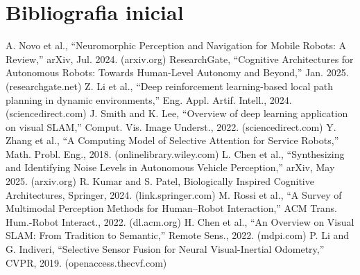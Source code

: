 \documentclass[a4paper,12pt]{article}
\begin{document}
	\section{Bibliografia inicial}
	\begin{thebibliography}{99}
		 A. Novo et al., “Neuromorphic Perception and Navigation for Mobile Robots: A Review,” arXiv, Jul. 2024. (arxiv.org)
		 ResearchGate, “Cognitive Architectures for Autonomous Robots: Towards Human-Level Autonomy and Beyond,” Jan. 2025. (researchgate.net)
		 Z. Li et al., “Deep reinforcement learning-based local path planning in dynamic environments,” Eng. Appl. Artif. Intell., 2024. (sciencedirect.com)
		 J. Smith and K. Lee, “Overview of deep learning application on visual SLAM,” Comput. Vis. Image Underst., 2022. (sciencedirect.com)
		 Y. Zhang et al., “A Computing Model of Selective Attention for Service Robots,” Math. Probl. Eng., 2018. (onlinelibrary.wiley.com)
		 L. Chen et al., “Synthesizing and Identifying Noise Levels in Autonomous Vehicle Perception,” arXiv, May 2025. (arxiv.org)
		 R. Kumar and S. Patel, Biologically Inspired Cognitive Architectures, Springer, 2024. (link.springer.com)
		 M. Rossi et al., “A Survey of Multimodal Perception Methods for Human–Robot Interaction,” ACM Trans. Hum.-Robot Interact., 2022. (dl.acm.org)
		 H. Chen et al., “An Overview on Visual SLAM: From Tradition to Semantic,” Remote Sens., 2022. (mdpi.com)
		 P. Li and G. Indiveri, “Selective Sensor Fusion for Neural Visual-Inertial Odometry,” CVPR, 2019. (openaccess.thecvf.com)
	\end{thebibliography}
	
\end{document}
